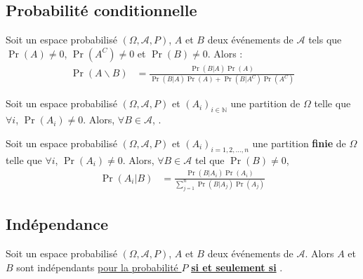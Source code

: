 \documentclass[10pt, french]{report}
\begin{document}
\begin{multicols*}{2}
\subsection{Probabilité conditionnelle}
\begin{definitionNOHFILLpropos}
Soit un espace probabilisé $(\Omega, \mathcal{A}, P)$, $A$ et $B$ deux événements de $\mathcal{A}$ tels que $\Pr(A) \neq 0$, $\Pr(A^{C}) \neq 0$  et $\Pr(B) \neq 0$. Alors : 
\begin{align*}
	\Pr(A \smallsetminus B)
	&=	\frac{\Pr(B | A)\Pr(A)}{\Pr(B | A)\Pr(A) + \Pr(B | A^{C})\Pr(A^{C})}
\end{align*}
\end{definitionNOHFILLpropos}


\begin{definitionNOHFILLpropos}
Soit un espace probabilisé $(\Omega, \mathcal{A}, P)$ et $(A_{i})_{i \in \mathbb{N}}$ une partition de $\Omega$ telle que $\forall i$, $\Pr(A_{i}) \neq 0$. Alors, $\forall B \in \mathcal{A}$, .

\end{definitionNOHFILLpropos}
\begin{definitionNOHFILLpropos}
Soit un espace probabilisé $(\Omega, \mathcal{A}, P)$ et $(A_{i})_{i = 1, 2, \dots, n}$ une partition \textbf{finie} de $\Omega$ telle que $\forall i$, $\Pr(A_{i}) \neq 0$. Alors, $\forall B \in \mathcal{A}$ tel que $\Pr(B) \neq 0$,
\begin{align*}
	\Pr(A_{i} | B)
	&=	\frac{\Pr(B | A_{i})\Pr(A_{i})}{\sum_{j = 1}^{n} \Pr(B | A_{j})\Pr(A_{j})}
\end{align*}
\end{definitionNOHFILLpropos}


\columnbreak
\subsection{Indépendance}
\begin{definitionNOHFILL}
Soit un espace probabilisé $(\Omega, \mathcal{A}, P)$, $A$ et $B$ deux événements de $\mathcal{A}$. Alors $A$ et $B$ sont indépendants \underline{pour la probabilité $P$} \textbf{\underline{si et seulement si}} .

\bigskip


\end{definitionNOHFILL}
\end{multicols*}
\end{document}
